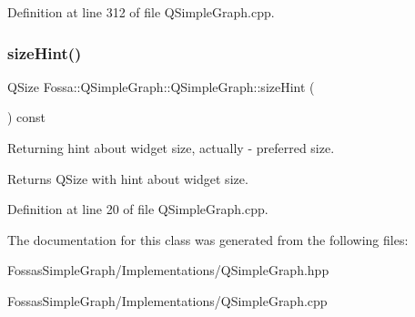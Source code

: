 Definition at line 312 of file Q\+Simple\+Graph.\+cpp.

\mbox{\label{class_fossa_1_1_q_simple_graph_1_1_q_simple_graph_a7cc7465f2137a1d9f80425afec47faeb}} 
\subsubsection{\texorpdfstring{size\+Hint()}{sizeHint()}}
{\footnotesize\ttfamily Q\+Size Fossa\+::\+Q\+Simple\+Graph\+::\+Q\+Simple\+Graph\+::size\+Hint (\begin{DoxyParamCaption}{ }\end{DoxyParamCaption}) const}



Returning hint about widget size, actually -\/ preferred size. 

\begin{DoxyReturn}{Returns}
Q\+Size with hint about widget size. 
\end{DoxyReturn}


Definition at line 20 of file Q\+Simple\+Graph.\+cpp.



The documentation for this class was generated from the following files\+:\begin{DoxyCompactItemize}
\item 
Fossas\+Simple\+Graph/\+Implementations/Q\+Simple\+Graph.\+hpp\item 
Fossas\+Simple\+Graph/\+Implementations/Q\+Simple\+Graph.\+cpp\end{DoxyCompactItemize}
